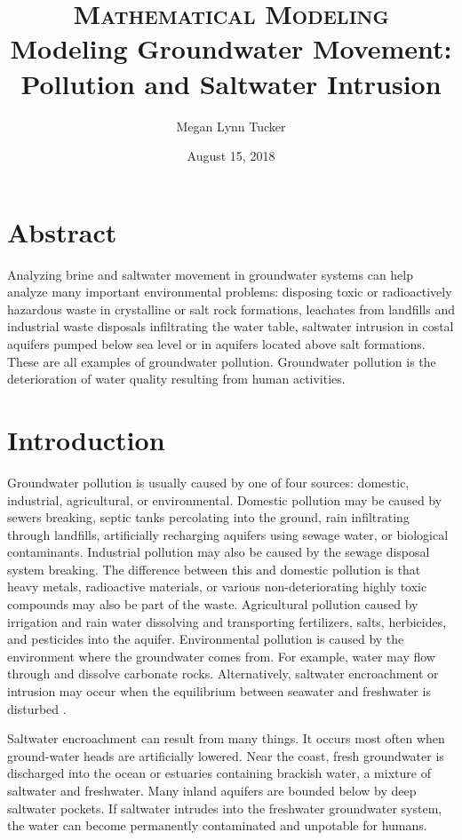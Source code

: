 \documentclass{article}
\title{
\normalfont \normalsize 
\textsc{Mathematical Modeling} \\ [20pt]
\huge Modeling Groundwater Movement: \\ Pollution and Saltwater Intrusion
}
\author{Megan Lynn Tucker}
\date{August 15, 2018}
\begin{document}
\maketitle

\pagebreak

\section*{Abstract}
Analyzing brine and saltwater movement in groundwater systems can help analyze many important environmental problems: 
disposing toxic or radioactively hazardous waste in crystalline or salt rock formations, 
leachates from landfills and industrial waste disposals infiltrating the water table\cite{1}, 
saltwater intrusion in costal aquifers pumped below sea level\cite{2} or in aquifers located above salt formations\cite{3}. 
These are all examples of groundwater pollution. 
Groundwater pollution is the deterioration of water quality resulting from human activities\cite{4}. 

\section*{Introduction}
Groundwater pollution is usually caused by one of four sources: domestic, industrial, agricultural, or environmental. 
Domestic pollution may be caused by sewers breaking, septic tanks percolating into the ground, rain infiltrating through landfills, artificially recharging aquifers using sewage water, or biological contaminants. 
Industrial pollution may also be caused by the sewage disposal system breaking. 
The difference between this and domestic pollution is that heavy metals, radioactive materials, or various non-deteriorating highly toxic compounds may also be part of the waste. 
Agricultural pollution caused by irrigation and rain water dissolving and transporting fertilizers, salts, herbicides, and pesticides into the aquifer. 
Environmental pollution is caused by the environment where the groundwater comes from.
For example, water may flow through and dissolve carbonate rocks.
Alternatively, saltwater encroachment or intrusion may occur when the equilibrium between seawater and freshwater is disturbed \cite{5}.

Saltwater encroachment can result from many things.
It occurs most often when ground-water heads are artificially lowered. 
Near the coast, fresh groundwater is discharged into the ocean or estuaries containing brackish water, a mixture of saltwater and freshwater\cite{2}. 
Many inland aquifers are bounded below by deep saltwater pockets\cite{3}. 
If saltwater intrudes into the freshwater groundwater system, the water can become permanently contaminated and unpotable for humans.
\end{document}
